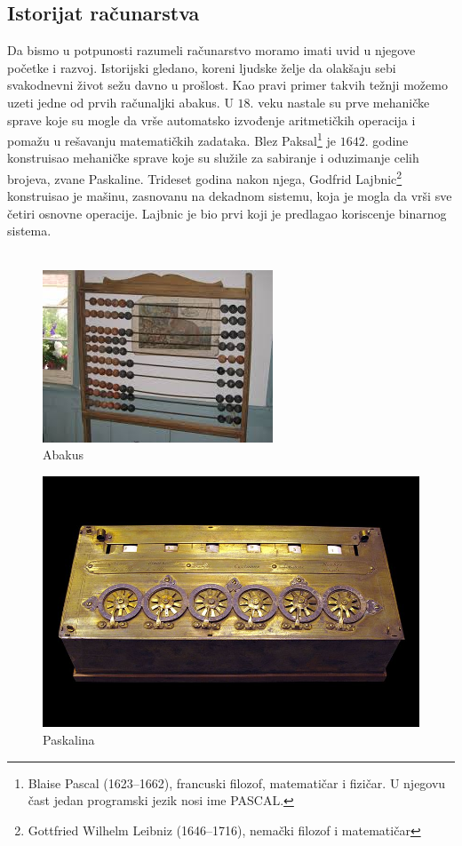 \documentclass[a4paper]{article}
\begin{document}
\subsection{Istorijat računarstva}
Da bismo u potpunosti razumeli računarstvo moramo imati uvid u njegove početke i razvoj. Istorijski gledano, koreni ljudske želje da olakšaju sebi svakodnevni život sežu davno u prošlost. Kao pravi primer takvih težnji možemo uzeti jedne od prvih računaljki abakus. U $18.$ veku nastale su prve mehaničke sprave koje su mogle da vrše automatsko izvođenje aritmetičkih operacija i pomažu u rešavanju matematičkih zadataka. Blez Paksal\footnote{Blaise Pascal (1623–1662), francuski filozof, matematičar i fizičar. U njegovu čast jedan
programski jezik nosi ime PASCAL.} je $1642.$ godine konstruisao mehaničke sprave koje su služile za sabiranje i oduzimanje celih brojeva, zvane Paskaline. Trideset godina nakon njega, Godfrid Lajbnic\footnote{Gottfried Wilhelm Leibniz (1646–1716), nemački filozof i matematičar} konstruisao je mašinu, zasnovanu na dekadnom sistemu, koja je mogla da vrši sve četiri osnovne operacije. Lajbnic je bio prvi koji je predlagao koriscenje binarnog sistema.\\\\ 
\begin{figure}[h!]
\begin{center}
\includegraphics[scale=0.5]{pictures/abakus.jpg}
\end{center}
\caption{Abakus}
\label{fig:abakus}
\end{figure}
\begin{figure}[h!]
\begin{center}
\includegraphics[scale=0.25]{pictures/pasc.jpg}
\end{center}
\caption{Paskalina}
\label{fig:pasc}
\end{figure}
\end{document}
